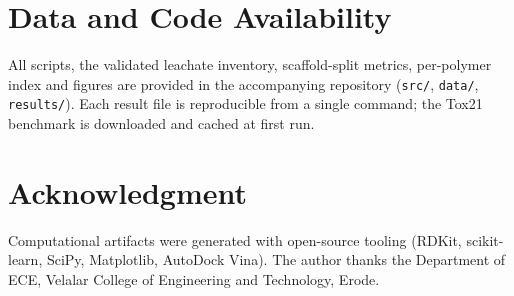 \documentclass[journal]{IEEEtran}
\begin{document}
\section*{Data and Code Availability}
All scripts, the validated leachate inventory, scaffold-split metrics, per-polymer
index and figures are provided in the accompanying repository
(\texttt{src/}, \texttt{data/}, \texttt{results/}). Each result file is
reproducible from a single command; the Tox21 benchmark is downloaded and cached
at first run.

\section*{Acknowledgment}
Computational artifacts were generated with open-source tooling (RDKit,
scikit-learn, SciPy, Matplotlib, AutoDock Vina). The author thanks the Department
of ECE, Velalar College of Engineering and Technology, Erode.
\end{document}
